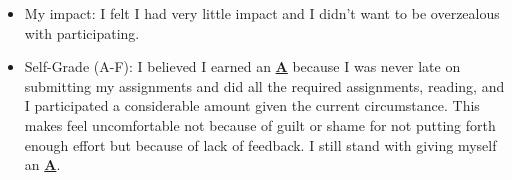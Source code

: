 \documentclass{article}
\begin{document}
\begin{enumerate}
\begin{itemize}
        \item My impact: I felt I had very little impact and I didn't want to be overzealous with participating.  

        \item Self-Grade (A-F): I believed I earned an \underline{\textbf{A}} because I was never late on submitting my assignments and did all the required assignments, reading, and I participated a considerable amount given the current circumstance. This makes feel uncomfortable not because of guilt or shame for not putting forth enough effort but because of lack of feedback. I still stand with giving myself an \underline{\textbf{A}}.

    \end{itemize}

\end{enumerate}
\end{document}
